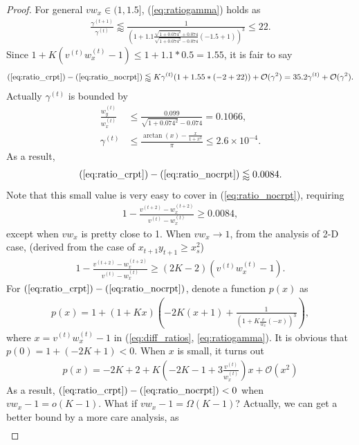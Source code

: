 \documentclass{article}
\theoremstyle{plain}
\theoremstyle{remark}
\newcommand{\T}[1]{^{(#1)}}
\def\t{^{(t)}}
\def\tt{^{(t+1)}}
\def\O{\mathcal{O}}
\begin{document}
\begin{proof}
For general $vw_x\in(1,1.5]$, (\ref{eq:ratiogamma}) holds as
\begin{align}
    \frac{\gamma\tt}{\gamma\t}\lessapprox \frac{1}{(1+1.1\frac{\sqrt{1+0.074^2}+0.074}{\sqrt{1+0.074^2}-0.074}(-1.5+1))^3} \le 22. 
\end{align}
Since $1+K(v\t w_x\t-1)\le 1+1.1*0.5=1.55$, it is fair to say
\begin{align}
    (\ref{eq:ratio_crpt})-(\ref{eq:ratio_nocrpt})\lessapprox  K\gamma\t(1+1.55*(-2+22)) + \O(\gamma^2) = 35.2\gamma\t + \O(\gamma^2).
\end{align}
Actually $\gamma\t$ is bounded by
\begin{align}
     \frac{w_y\t}{w_x\t} &\le \frac{0.099}{\sqrt{1+0.074^2}-0.074}=0.1066,\\
    \gamma\t &\le \frac{\arctan(x)-\frac{x}{1+x^2}}{\pi}\le 2.6\times 10^{-4}.
\end{align}
As a result, 
\begin{align}
    (\ref{eq:ratio_crpt})-(\ref{eq:ratio_nocrpt})\lessapprox 0.0084.
\end{align}
Note that this small value is very easy to cover in (\ref{eq:ratio_nocrpt}), requiring
\begin{align}
    1-\frac{v\T{t+2}-w_x\T{t+2}}{v\t-w_x\t}\ge 0.0084,
\end{align}
except when $vw_x$ is pretty close to 1. When $vw_x\xrightarrow{} 1$, from the analysis of 2-D case, (derived from the case of $x_{t+1} y_{t+1}\ge x_s^2$)
\begin{align}
    1-\frac{v\T{t+2}-w_x\T{t+2}}{v\t-w_x\t} \ge (2K-2)(v\t w_x\t -1).
\end{align}
For $(\ref{eq:ratio_crpt})-(\ref{eq:ratio_nocrpt})$, denote a function $p(x)$ as
\begin{align}
    p(x) = 1+(1+Kx)\left(-2K(x+1)+\frac{1}{\left(1+K\frac{v}{w_x}(-x)\right)^3}\right),
\end{align}
where $x=v\t w_x\t - 1$ in (\ref{eq:diff_ratios}, \ref{eq:ratiogamma}). It is obvious that $p(0)=1+(-2K+1)<0$. When $x$ is small, it turns out
\begin{align}
    p(x) = -2K + 2 + K\left(-2K-1+3\frac{v\t}{w_x\t}\right)x + \O(x^2) \label{eq:px0}
\end{align}
As a result, $(\ref{eq:ratio_crpt})-(\ref{eq:ratio_nocrpt})<0$ when $v w_x-1=o(K-1)$. What if $vw_x-1=\Omega(K-1)$? Actually, we can get a better bound by a more care analysis, as
\begin{align}

\end{align}
\end{proof}
\end{document}
